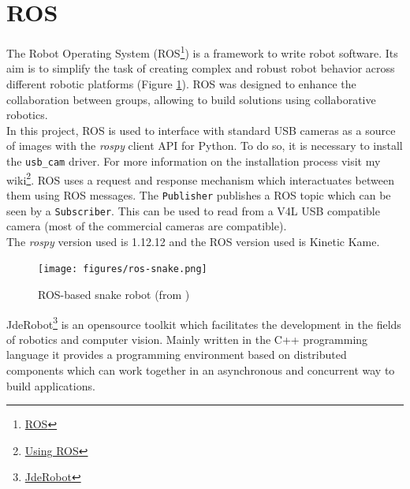 \section{ROS}
The Robot Operating System (ROS\footnote {\href{https://www.ros.org/}{ROS}}) is a framework to write robot software. Its aim is to simplify the task of creating complex and robust robot behavior across different robotic platforms (Figure \ref{fig:ros_snake}). ROS was designed to enhance the collaboration between groups, allowing to build solutions using collaborative robotics.\\
In this project, ROS is used to interface with standard USB cameras as a source of images with the \textit{rospy} client API for Python. To do so, it is necessary to install the \texttt{usb\_cam} driver. For more information on the installation process visit my wiki\footnote {\label{using_ros}\href{https://jderobot.org/Arodriguez-tfm\#Week_24:_Introducing_ROS}{Using ROS}}. ROS uses a request and response mechanism which interactuates between them using ROS messages. The \texttt{Publisher} publishes a ROS topic which can be seen by a \texttt{Subscriber}. This can be used to read from a V4L USB compatible camera (most of the commercial cameras are compatible).\\
The \textit{rospy} version used is 1.12.12 and the ROS version used is Kinetic Kame.\\
\begin{figure}[H]
\begin{center}
\texttt{[image: figures/ros-snake.png]}
\caption{ROS-based snake robot (from \cite{sanfilippo2019serpens})}
\label{fig:ros_snake}
\end{center}
\end{figure}
JdeRobot\footnote {\href{https://jderobot.org/Main_Page}{JdeRobot}} is an opensource toolkit which facilitates the development in the fields of robotics and computer vision. Mainly written in the C++ programming language it provides a programming environment based on distributed components which can work together in an asynchronous and concurrent way to build applications.


